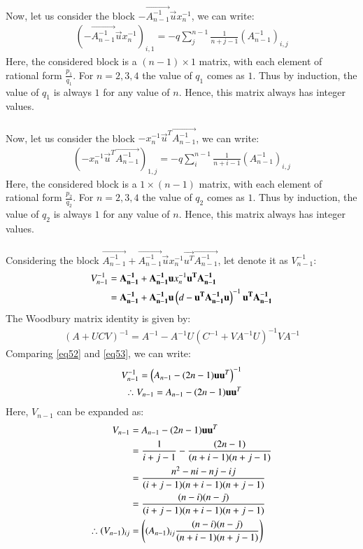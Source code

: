 \documentclass[journal,12pt,twocolumn]{IEEEtran}
\begin{document}
Now, let us consider the block $-\vec{A_{n-1}^{-1}}\vec{u}x_n^{-1}$, we can write:
\begin{align}
   (-\vec{A_{n-1}^{-1}}\vec{u}x_n^{-1})_{i,1}= -q\sum_j ^{n-1}\frac{1}{n+j-1}(A_{n-1}^{-1})_{i,j}
\end{align}
Here, the considered block is a $(n-1) \times 1$ matrix, with each element of rational form $\frac{p_1}{q_1}$. For $n=2,3,4$ the value of $q_1$ comes as $1$. Thus by induction, the value of $q_1$ is always $1$ for any value of $n$. Hence, this matrix always has integer values. \\\\
Now, let us consider the block $-x_n^{-1}\vec{u}^T\vec{A_{n-1}^{-1}}$, we can write:
\begin{align}
   (-x_n^{-1}\vec{u}^T\vec{A_{n-1}^{-1}})_{1,j}= -q\sum_i ^{n-1}\frac{1}{n+i-1}(A_{n-1}^{-1})_{i,j}
\end{align}
Here, the considered block is a $1 \times (n-1)$ matrix, with each element of rational form $\frac{p_2}{q_2}$. For $n=2,3,4$ the value of $q_2$ comes as $1$. Thus by induction, the value of $q_2$ is always $1$ for any value of $n$. Hence, this matrix always has integer values. \\\\
Considering the block $\vec{A_{n-1}^{-1}}+\vec{A_{n-1}^{-1}}\vec{u}x_n^{-1}\vec{u^T}\vec{A_{n-1}^{-1}}$, let denote it as $V_{n-1}^{-1}$:
\begin{align}
    V_{n-1}^{-1}&=\mathbf{A_{n-1}^{-1}}+\mathbf{A_{n-1}^{-1}}\mathbf{u}x_n^{-1}\mathbf{u^T}\mathbf{A_{n-1}^{-1}}\\
    &=\mathbf{A_{n-1}^{-1}}+\mathbf{A_{n-1}^{-1}}\mathbf{u}\left(d-\mathbf{u^T}\mathbf{A_{n-1}^{-1}}\mathbf{u}\right)^{-1}\mathbf{u^T}\mathbf{A_{n-1}^{-1}} \label{eq52}
\end{align}
The Woodbury matrix identity is given by:
\begin{align}
    \boxed{\left(A+UCV\right)^{-1}=A^{-1}-A^{-1}U\left(C^{-1}+VA^{-1}U\right)^{-1}VA^{-1}} \label{eq53}
\end{align}
Comparing \eqref{eq52} and \eqref{eq53}, we can write:
\begin{align}
    V_{n-1}^{-1}=\left(A_{n-1}-(2n-1)\mathbf{u}\mathbf{u}^T\right)^{-1}\\
    \therefore  V_{n-1}=A_{n-1}-(2n-1)\mathbf{u}\mathbf{u}^T
\end{align}
Here, $V_{n-1}$ can be expanded as:
\begin{align}
    V_{n-1}&=A_{n-1}-(2n-1)\mathbf{u}\mathbf{u}^T\\
    &=\frac{1}{i+j-1}-\frac{(2n-1)}{(n+i-1)(n+j-1)}\\
    &=\frac{n^2-ni-nj-ij}{(i+j-1)(n+i-1)(n+j-1)}\\
    &=\frac{(n-i)(n-j)}{(i+j-1)(n+i-1)(n+j-1)}\\
    \therefore (V_{n-1})_{ij}&=\left((A_{n-1})_{ij}\frac{(n-i)(n-j)}{(n+i-1)(n+j-1)}\right) \label{eq60}
\end{align}
\end{document}
